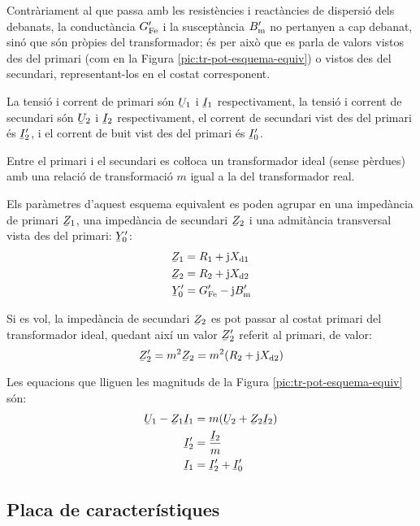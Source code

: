 Contràriament al que passa amb les resistències i reactàncies de dispersió dels debanats, la conductància $G_\mathrm{Fe}'$ i la susceptància $B_\mathrm{m}'$ no pertanyen a cap debanat, sinó que són pròpies del transformador; és per això que es parla de valors vistos des del primari (com en la Figura \vref{pic:tr-pot-esquema-equiv}) o vistos des del secundari, representant-los en el costat corresponent.

La tensió i corrent de primari són $\cmplx{U}_1$ i $\cmplx{I}_1$ respectivament, la tensió i corrent de secundari són $\cmplx{U}_2$ i $\cmplx{I}_2$ respectivament, el corrent de secundari vist des del primari és $\cmplx{I}_2'$, i el corrent de buit vist des del primari és $\cmplx{I}_0'$.

Entre el primari i el secundari es coŀloca un transformador ideal (sense pèrdues) amb una relació de transformació $m$ igual a la del transformador real.

Els paràmetres d'aquest esquema equivalent es poden agrupar en una impedància de primari $\cmplx{Z}_1$, una impedància de secundari $\cmplx{Z}_2$ i una  admitància transversal vista des del primari: $\cmplx{Y}_0'$:
\begin{align}
    \cmplx{Z}_1 &= R_1 + \ju X\ped{d1} \\
    \cmplx{Z}_2 &= R_2 + \ju X\ped{d2}\\
    \cmplx{Y}_0' &= G\ped{Fe}'- \ju B\ped{m}'
\end{align}

Si es vol, la impedància de secundari $\cmplx{Z}_2$ es pot passar al costat primari del transformador ideal, quedant així un valor $\cmplx{Z}_2'$ referit al primari, de valor:
\begin{equation}
    \cmplx{Z}_2' = m^2 \cmplx{Z}_2 =  m^2 (R_2 + \ju X\ped{d2})
\end{equation}

Les equacions que lliguen les magnituds de la Figura \vref{pic:tr-pot-esquema-equiv} són:
\begin{align}
    \cmplx{U}_1 - \cmplx{Z}_1 \cmplx{I}_1 &= m ( \cmplx{U}_2  + \cmplx{Z}_2 \cmplx{I}_2 ) \\
    \cmplx{I}_2' &=   \frac{\cmplx{I}_2}{m} \\
    \cmplx{I}_1  &=   \cmplx{I}_2' + \cmplx{I}_0'
\end{align}


\subsection{Placa de característiques}

